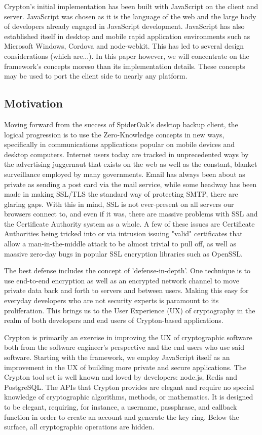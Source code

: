 \documentclass[conference]{IEEEtran}
\begin{document}
Crypton's initial implementation has been built with JavaScript on the
client and server. JavaScript was chosen as it is the language of the web
and the large body of developers already engaged in JavaScript development.
JavaScript has also established itself in desktop and mobile rapid application
environments such as Microsoft Windows\cite{JavaScriptWindows},
Cordova\cite{Cordova} and node-webkit\cite{nodewebkit}.
This has led to several design considerations (which are...).
In this paper however, we will concentrate on the framework's
concepts moreso than its implementation details. These concepts may be used
to port the client side to nearly any platform.

\subsection{Motivation}
Moving forward from the success of SpiderOak's desktop backup client,
the logical progression is to use the Zero-Knowledge concepts in new ways,
specifically in communications applications popular on mobile devices
and desktop computers. Internet users today are tracked in unprecedented
ways by the advertising juggernaut that exists on the web as well as the
constant, blanket surveillance employed by many governments.
Email has always been about as private as sending a post card via the mail
service, while some headway has been made in making SSL/TLS the standard
way of protecting SMTP, there are glaring gaps. With this in mind,
SSL is not ever-present on all servers our browsers connect to,
and even if it was, there are massive problems with SSL and the
Certificate Authority system as a whole. A few of these issues are
Certificate Authorities being tricked into or via intrusion issuing
"valid" certificates that allow a man-in-the-middle attack to be almost
trivial to pull off, as well as massive zero-day bugs in popular SSL
encryption libraries such as OpenSSL.

The best defense includes the concept of 'defense-in-depth'\cite{defenseindepth}.
One technique is to use end-to-end encryption as well as an encrypted network
channel to move private data back and forth to servers and between users.
Making this easy for everyday developers who are not security experts is
paramount to its proliferation. This brings us to the User Experience (UX) of
cryptography in the realm of both developers and end users of Crypton-based
applications.

Crypton is primarily an exercise in improving the UX of cryptographic
software both from the software engineer's perspective and the
end users who use said software. Starting with the framework,
we employ JavaScript itself as an improvement in the UX of building
more private and secure applications. The Crypton tool set is well known
and loved by developers: node.js, Redis and PostgreSQL. The APIs that
Crypton provides are elegant and require no special knowledge of cryptographic
algorithms, methods, or mathematics. It is designed to be elegant, requiring,
for instance, a username, passphrase, and callback function in order to create
an account and generate the key ring. Below the surface, all cryptographic
operations are hidden.
\end{document}
